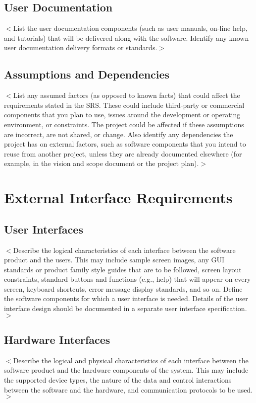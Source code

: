 \documentclass[a4paper, 11pt]{scrreprt}
\begin{document}
\section{User Documentation}
$<$List the user documentation components (such as user manuals, on-line help, 
and tutorials) that will be delivered along with the software. Identify any 
known user documentation delivery formats or standards.$>$
\section{Assumptions and Dependencies}

$<$List any assumed factors (as opposed to known facts) that could affect the 
requirements stated in the SRS. These could include third-party or commercial 
components that you plan to use, issues around the development or operating 
environment, or constraints. The project could be affected if these assumptions 
are incorrect, are not shared, or change. Also identify any dependencies the 
project has on external factors, such as software components that you intend to 
reuse from another project, unless they are already documented elsewhere (for 
example, in the vision and scope document or the project plan).$>$


\chapter{External Interface Requirements}

\section{User Interfaces}
$<$Describe the logical characteristics of each interface between the software 
product and the users. This may include sample screen images, any GUI standards 
or product family style guides that are to be followed, screen layout 
constraints, standard buttons and functions (e.g., help) that will appear on 
every screen, keyboard shortcuts, error message display standards, and so on.  
Define the software components for which a user interface is needed. Details of 
the user interface design should be documented in a separate user interface 
specification.$>$

\section{Hardware Interfaces}
$<$Describe the logical and physical characteristics of each interface between 
the software product and the hardware components of the system. This may include 
the supported device types, the nature of the data and control interactions 
between the software and the hardware, and communication protocols to be 
used.$>$
\end{document}
